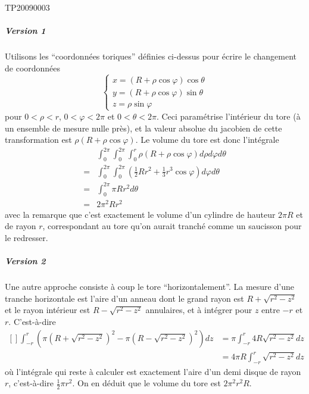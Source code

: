 \begin{corrige}{TP20090003}
\subparagraph{Version 1}
Utilisons les ``coordonnées toriques'' définies ci-dessus pour écrire
le changement de coordonnées
\begin{equation*}
  \begin{cases}
    x = (R + \rho\cos \varphi) \cos \theta\\
    y = (R + \rho\cos \varphi) \sin \theta\\
    z = \rho \sin \varphi%
  \end{cases}
\end{equation*}
pour $0 < \rho < r$, $0 < \varphi < 2\pi$ et $0 < \theta < 2\pi$. Ceci
paramétrise l'intérieur du tore (à un ensemble de mesure nulle près),
et la valeur absolue du jacobien de cette transformation est $\rho (R
+ \rho \cos \varphi)$. Le volume du tore est donc l'intégrale
\begin{equation*}
  \begin{split}
    &\int_0^{2\pi} \int_0^{2\pi} \int_0^r \rho (R + \rho \cos \varphi) d\rho d\varphi  d\theta\\
    = &\int_0^{2\pi} \int_0^{2\pi} \left(\frac12 R r^2 +
      \frac 13 r^3 \cos \varphi\right)  d\varphi  d\theta\\
    = &\int_0^{2\pi}  \pi R r^2  d\theta\\
    = &2 \pi^2 R r^2
  \end{split}
\end{equation*}
avec la remarque que c'est exactement le volume d'un cylindre de
hauteur $2\pi R$ et de rayon $r$, correspondant au tore qu'on aurait
tranché comme un saucisson pour le redresser.


\subparagraph{Version 2}
Une autre approche consiste à coup le tore ``horizontalement''. La
mesure d'une tranche horizontale est l'aire d'un anneau dont le grand
rayon est $R + \sqrt{r^2 - z^2}$ et le rayon intérieur est $R - \sqrt{r^2 - z^2}$
annulaires, et à intégrer pour $z$ entre $-r$ et $r$. C'est-à-dire
\begin{equation}
	\begin{aligned}[]
  		\int_{-r}^r \left(\pi (R+\sqrt{r^2-z^2})^2 - \pi (R-\sqrt{r^2-z^2})^2\right)  d z 	&= \pi \int_{-r}^r 4 R \sqrt{r^2 - z^2}  d z\\
													&= 4 \pi R \int_{-r}^r \sqrt{r^2-z^2}  d z
	\end{aligned}
\end{equation}
où l'intégrale qui reste à calculer est exactement l'aire d'un demi disque de rayon $r$, c'est-à-dire $\frac{ 1 }{2} \pi r^2$. On en déduit que le
volume du tore est $2 \pi^2 r^2 R$.



\end{corrige}

